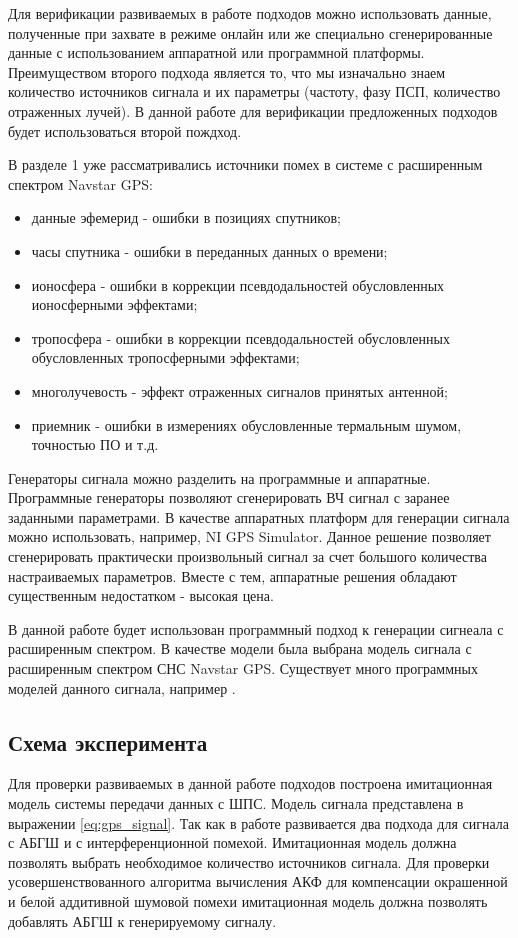 
Для верификации развиваемых в работе подходов можно использовать данные, полученные при захвате в режиме онлайн или же
специально сгенерированные данные с использованием аппаратной или программной платформы. Преимуществом второго подхода
является то, что мы изначально знаем количество источников сигнала и их параметры (частоту, фазу ПСП, количество отраженных лучей).
В данной работе для верификации предложенных подходов будет использоваться второй пождход.

В разделе 1 уже рассматривались источники помех в системе с расширенным спектром Navstar GPS:
\begin{itemize}
	\item {данные эфемерид - ошибки в позициях спутников;}
	\item {часы спутника - ошибки в переданных данных о времени;}
	\item {ионосфера - ошибки в коррекции псевдодальностей обусловленных ионосферными эффектами;}
	\item {тропосфера - ошибки в коррекции псевдодальностей обусловленных обусловленных тропосферными эффектами;}
	\item {многолучевость - эффект отраженных сигналов принятых антенной;}
	\item {приемник - ошибки в измерениях обусловленные термальным шумом, точностью ПО и т.д.}
\end{itemize}

Генераторы сигнала можно разделить на программные и аппаратные. Программные генераторы позволяют сгенерировать
ВЧ сигнал с заранее заданными параметрами. В качестве аппаратных платформ для генерации сигнала можно использовать, например,
NI GPS Simulator. Данное решение позволяет сгенерировать практически произвольный сигнал за
счет большого количества настраиваемых параметров. Вместе с тем, аппаратные решения обладают существенным недостатком - высокая цена.

В данной работе будет использован программный подход к генерации сигнеала с расширенным спектром. В качестве модели была выбрана модель
сигнала с расширенным спектром СНС Navstar GPS. Существует много программных моделей данного сигнала,
например \cite{hannah_phd, burns_model, corbell_model, crs_model, brown_model}.

\subsection{Схема эксперимента}
Для проверки развиваемых в данной работе подходов построена имитационная модель системы передачи данных с ШПС.
Модель сигнала представлена в выражении \ref{eq:gps_signal}. Так как в работе развивается два подхода для сигнала
с АБГШ и с интерференционной помехой. Имитационная модель должна позволять выбрать необходимое количество источников сигнала.
Для проверки усовершенствованного алгоритма вычисления АКФ для компенсации окрашенной и белой аддитивной шумовой помехи
имитационная модель должна позволять добавлять АБГШ к генерируемому сигналу. 

